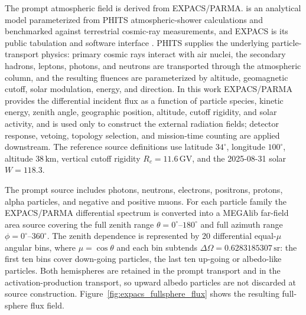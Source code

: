 \documentclass[11pt]{article}
\begin{document}
The prompt atmospheric field is derived from EXPACS/PARMA.  is an
analytical model parameterized from PHITS atmospheric-shower calculations and
benchmarked against terrestrial cosmic-ray measurements, and EXPACS is its
public tabulation and software interface
\cite{Sato2015EXPACS,Sato2016PARMA4}. PHITS supplies the underlying
particle-transport physics: primary cosmic rays interact with air nuclei, the
secondary hadrons, leptons, photons, and neutrons are transported through the
atmospheric column, and the resulting fluences are parameterized by altitude,
geomagnetic cutoff, solar modulation, energy, and direction. In this work
EXPACS/PARMA provides the differential incident flux as a function of particle
species, kinetic energy, zenith angle, geographic position, altitude, cutoff
rigidity, and solar activity, and is used only to construct the external
radiation fields; detector response, vetoing, topology selection, and
mission-time counting are applied downstream. The reference source definitions
use latitude $34^\circ$, longitude $100^\circ$, altitude $38\,\mathrm{km}$,
vertical cutoff rigidity $R_c=11.6\,\mathrm{GV}$, and the 2025-08-31 solar
 $W=118.3$.

The prompt source includes photons, neutrons, electrons, positrons, protons,
alpha particles, and negative and positive muons. For each particle family the
EXPACS/PARMA differential spectrum is converted into a MEGAlib far-field area
source covering the full zenith range $\theta=0^\circ$--$180^\circ$ and full
azimuth range $\phi=0^\circ$--$360^\circ$. The zenith dependence is represented
by 20 differential equal-$\mu$ angular bins, where $\mu=\cos\theta$ and each
bin subtends $\Delta\Omega=0.6283185307\,\mathrm{sr}$: the first ten bins cover
down-going particles, the last ten up-going or albedo-like particles. Both
hemispheres are retained in the prompt transport and in the
activation-production transport, so upward albedo particles are not discarded
at source construction. Figure~\ref{fig:expacs_fullsphere_flux} shows the
resulting full-sphere flux field.
\end{document}

